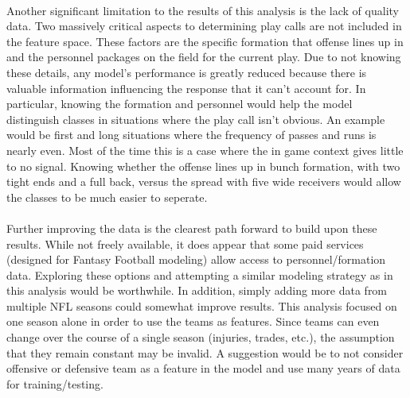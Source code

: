 \documentclass[11pt]{article}
\begin{document}
\begin{multicols*}{2}
            \vspace{-10pt}
            \paragraph{}
                Another significant limitation to the results of this analysis is the lack of quality data.
                Two massively critical aspects to determining play calls are not included in the feature space.
                These factors are the specific formation that offense lines up in and the personnel packages on the field for the current play. 
                Due to not knowing these details, any model's performance is greatly reduced because there is valuable information influencing the response that it can't account for. 
                In particular, knowing the formation and personnel would help the model distinguish classes in situations where the play call isn't obvious. 
                An example would be first and long situations where the frequency of passes and runs is nearly even. 
                Most of the time this is a case where the in game context gives little to no signal. 
                Knowing whether the offense lines up in bunch formation, with two tight ends and a full back, versus the spread with five wide receivers would allow the classes to be much easier to seperate.

            \vspace{-10pt}
            \paragraph{}
                Further improving the data is the clearest path forward to build upon these results. 
                While not freely available, it does appear that some paid services (designed for Fantasy Football modeling) allow access to personnel/formation data.
                Exploring these options and attempting a similar modeling strategy as in this analysis would be worthwhile.
                In addition, simply adding more data from multiple NFL seasons could somewhat improve results. 
                This analysis focused on one season alone in order to use the teams as features. 
                Since teams can even change over the course of a single season (injuries, trades, etc.), the assumption that they remain constant may be invalid.
                A suggestion would be to not consider offensive or defensive team as a feature in the model and use many years of data for training/testing.  


\newpage
\end{multicols*}
\end{document}
